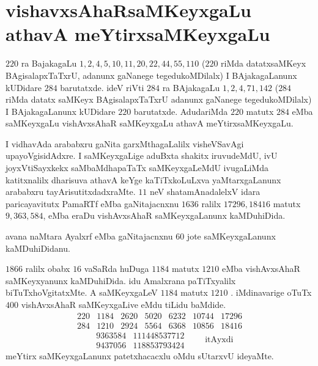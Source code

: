 \chapter{vishavxsAhaRsaMKeyxgaLu athavA meYtirxsaMKeyxgaLu}

$220$ ra BajakagaLu $1,2,4,5,10,11,20,22,44,55,110$ ($220$ riMda datatxsaMKeyx BAgisalapxTaTxrU, adanunx gaNanege tegedukoMDilalx) I BAjakagaLanunx kUDidare $284$ barutatxde. ideV riVti $284$ ra BAjakagaLu $1,2,4,71,142$ ($284$ riMda datatx saMKeyx BAgisalapxTaTxrU adanunx gaNanege tegedukoMDilalx) I BAjakagaLanunx kUDidare $220$ barutatxde. AdudariMda $220$ matutx $284$ eMba saMKeyxgaLu vishAvxsAhaR saMKeyxgaLu athavA meYtirxsaMKeyxgaLu.

I vidhavAda arababxru gaNita garxMthagaLalilx visheVSavAgi upayoVgisidAdxre. I saMKeyxgaLige aduBxta shakitx iruvudeMdU, ivU joyxVtiSayxkekx saMbaMdhapaTaTx saMKeyxgaLeMdU ivugaLiMda katitxnalilx dharisuva athavA keYge kaTiTxkoLuLxva yaMtarxgaLanunx arababxru tayArisutitxdadxraMte. $11$ neV shatamAnadalelxV idara paricayavitutx PamaRTf eMba gaNitajacnxnu $1636$ ralilx $17296, 18416$ matutx $9,363,584$, eMba  eraDu vishAvxsAhaR saMKeyxgaLanunx kaMDuhiDida.

avana naMtara Ayalxrf eMba gaNitajacnxnu $60$ jote saMKeyxgaLanunx kaMDuhiDidanu.

\qquad {} 
$1866$ ralilx obabx $16$ vaSaRda huDuga $1184$ matutx $1210$ eMba vishAvxsAhaR saMKeyxyanunx kaMDuhiDida. idu Amalxrana paTiTxyalilx biTuTxhoVgitatxMte. A saMKeyxgaLeV $1184$ matutx $1210$ . iMdinavarige oTuTx $400$ vishAvxsAhaR saMKeyxgaLive eMdu tiLidu baMdide. 
$$
\begin{matrix}
220 & 1184 & 2620 & 5020 & 6232 & 10744 & 17296\\ 
284 & 1210 & 2924 & 5564 & 6368 & 10856 & 18416 
\end{matrix}
$$
$$
\begin{matrix}
& 9363584 & 111448537712 \\
& 9437056 & 118853793424 
\end{matrix}
\qquad \text{itAyxdi} 
$$
meYtirx saMKeyxgaLanunx patetxhacacxlu oMdu sUtarxvU ideyaMte.
